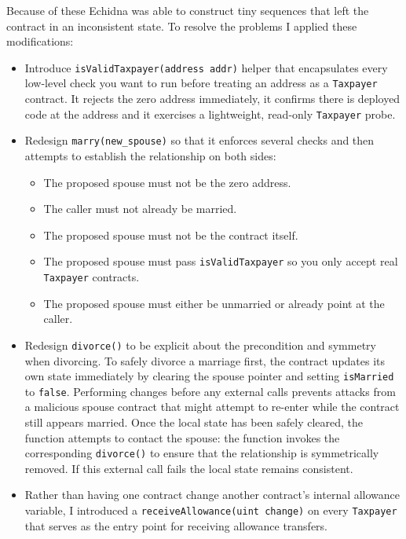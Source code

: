 Because of these Echidna was able to construct tiny sequences that left the contract in an inconsistent state.
To resolve the problems I applied these modifications:
\begin{itemize}
    \item Introduce \texttt{isValidTaxpayer(address addr)} helper that encapsulates every low-level check you want to run before treating an address as a \texttt{Taxpayer} contract. It rejects the zero address immediately, it confirms there is deployed code at the address and it exercises a lightweight, read-only \texttt{Taxpayer} probe.
    \item Redesign \texttt{marry(new\_spouse)} so that it enforces several checks and then attempts to establish the relationship on both sides:
    \begin{itemize}
        \item The proposed spouse must not be the zero address.
        \item The caller must not already be married.
        \item The proposed spouse must not be the contract itself.
        \item The proposed spouse must pass \texttt{isValidTaxpayer} so you only accept real \texttt{Taxpayer} contracts.
        \item The proposed spouse must either be unmarried or already point at the caller.
    \end{itemize}

\item Redesign \texttt{divorce()} to be explicit about the precondition and symmetry when divorcing.
To safely divorce a marriage first, the contract updates its own state immediately by clearing the spouse pointer and setting \texttt{isMarried} to \texttt{false}. Performing changes before any external calls prevents attacks from a malicious spouse contract that might attempt to re-enter while the contract still appears married.
Once the local state has been safely cleared, the function attempts to contact the spouse: the function invokes the corresponding \texttt{divorce()} to ensure that the relationship is symmetrically removed. If this external call fails the local state remains consistent.

\item Rather than having one contract change another contract’s internal allowance variable, I introduced a \texttt{receiveAllowance(uint change)} on every \texttt{Taxpayer} that serves as the entry point for receiving allowance transfers.


\end{itemize}
